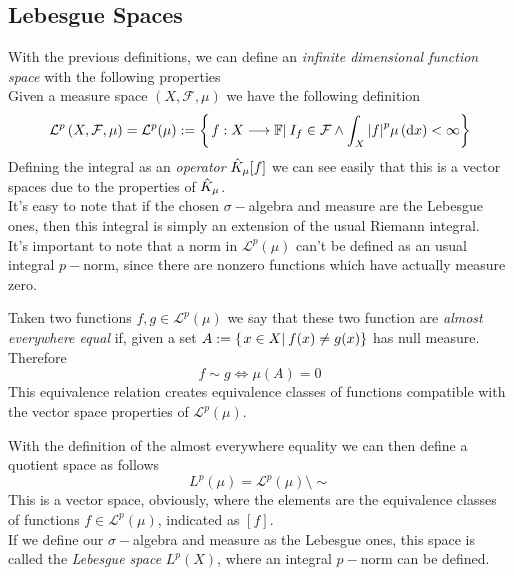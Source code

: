 \documentclass[../complete.tex]{subfiles}
\begin{document}
\subsection{Lebesgue Spaces}
\begin{dfn}
	With the previous definitions, we can define an \textit{infinite dimensional function space} with the following properties\\
	Given a measure space $(X,\mathcal{F},\mu)$ we have the following definition
	\begin{equation}
		\mathcal{L}^p\left( X,\mathcal{F},\mu \right)=\mathcal{L}^p(\mu):=\left\{\left.f: X\overset{}{\longrightarrow}\mathbb{F}\right|_{}I_f\in\mathcal{F}\wedge\int_{X}^{}\abs{f}^p\mu\left( \operatorname{d\!} x \right)<\infty \right\}
		\label{eq:mcLpspaces}
	\end{equation}
	Defining the integral as an \textit{operator} $\hat{K}_\mu[f]$ we can see easily that this is a vector spaces due to the properties of $\hat{K}_\mu$.\\
	It's easy to note that if the chosen $\sigma-$algebra and measure are the Lebesgue ones, then this integral is simply an extension of the usual Riemann integral.\\
	It's important to note that a norm in $\mathcal{L}^p(\mu)$ can't be defined as an usual integral $p-$norm, since there are nonzero functions which have actually measure zero.
\end{dfn}
\begin{dfn}
	Taken two functions $f,g\in\mathcal{L}^p(\mu)$ we say that these two function are \textit{almost everywhere equal} if, given a set $A:=\{\left.x\in X\right|_{}f(x)\ne g(x)\}$ has null measure. Therefore
	\begin{equation}
		f\sim g\iff\mu(A)=0
		\label{eq:almosteverywhereeq}
	\end{equation}
	This equivalence relation creates equivalence classes of functions compatible with the vector space properties of $\mathcal{L}^p(\mu)$.
\end{dfn}
\begin{dfn}[$L^p$-Spaces]
	With the definition of the almost everywhere equality we can then define a quotient space as follows
	\begin{equation}
		L^p(\mu)=\mathcal{L}^p(\mu)\setminus\sim
		\label{eq:lspace}
	\end{equation}
	This is a vector space, obviously, where the elements are the equivalence classes of functions $f\in\mathcal{L}^p(\mu)$, indicated as $[f]$.\\
	If we define our $\sigma-$algebra and measure as the Lebesgue ones, this space is called the \textit{Lebesgue space} $L^p(X)$, where an integral $p-$norm can be defined.
\end{dfn}
\end{document}
